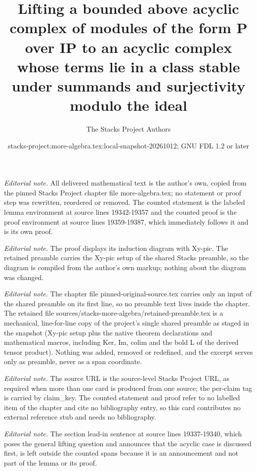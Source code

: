 \documentclass[10pt,a4paper]{amsart}
\title{Lifting a bounded above acyclic complex of modules of the form P over IP to an acyclic complex whose terms lie in a class stable under summands and surjectivity modulo the ideal}
\author{The Stacks Project Authors}
\date{stacks-project:more-algebra.tex:local-snapshot-20261012; GNU FDL 1.2 or later}
\theoremstyle{plain}
\theoremstyle{definition}
\theoremstyle{remark}
\numberwithin{equation}{subsection}
\begin{document}
\maketitle
\setcounter{subsection}{1}
\noindent\textit{Editorial note.} All delivered mathematical text is the author's own, copied from the pinned Stacks Project chapter file more-algebra.tex; no statement or proof step was rewritten, reordered or removed. The counted statement is the labeled lemma environment at source lines 19342-19357 and the counted proof is the proof environment at source lines 19359-19387, which immediately follows it and is its own proof.\par\medskip
\noindent\textit{Editorial note.} The proof displays its induction diagram with Xy-pic. The retained preamble carries the Xy-pic setup of the shared Stacks preamble, so the diagram is compiled from the author's own markup; nothing about the diagram was changed.\par\medskip
\noindent\textit{Editorial note.} The chapter file pinned-original-source.tex carries only an input of the shared preamble on its first line, so no preamble text lives inside the chapter. The retained file sources/stacks-more-algebra/retained-preamble.tex is a mechanical, line-for-line copy of the project's single shared preamble as staged in the snapshot (Xy-pic setup plus the native theorem declarations and mathematical macros, including Ker, Im, colim and the bold L of the derived tensor product). Nothing was added, removed or redefined, and the excerpt serves only as preamble, never as a span coordinate.\par\medskip
\noindent\textit{Editorial note.} The source URL is the source-level Stacks Project URL, as required when more than one card is produced from one source; the per-claim tag is carried by claim\_key. The counted statement and proof refer to no labelled item of the chapter and cite no bibliography entry, so this card contributes no external reference stub and needs no bibliography.\par\medskip
\noindent\textit{Editorial note.} The section lead-in sentence at source lines 19337-19340, which poses the general lifting question and announces that the acyclic case is discussed first, is left outside the counted spans because it is an announcement and not part of the lemma or its proof.\par\medskip
\end{document}
